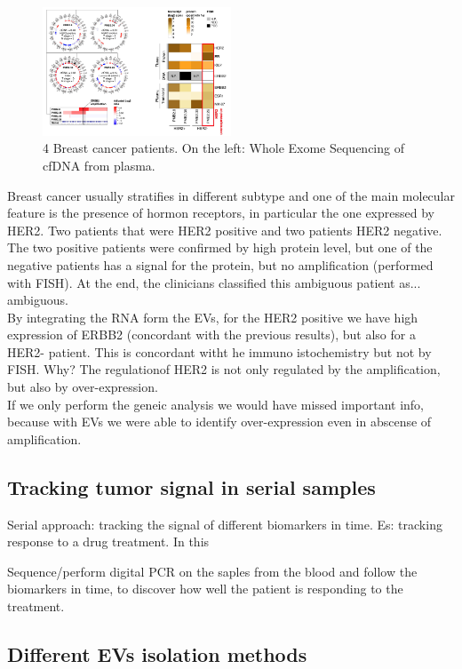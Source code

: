 \begin{figure}[H]
    \centering
    \includegraphics[width=0.5\textwidth]{cancer2.png}
    \caption{4 Breast cancer patients. On the left:  Whole Exome Sequencing of cfDNA from plasma. }
    \label{fig:cancer2}
\end{figure}

Breast cancer usually stratifies in different subtype and one of the main molecular feature is the presence of hormon receptors, in particular the one expressed by HER2.
Two patients that were HER2 positive and two patients HER2 negative. The two positive patients were confirmed by high protein level, but one of the negative patients has a signal for the protein, but no amplification (performed with FISH). At the end, the clinicians classified this ambiguous patient as... ambiguous.
\\
By integrating the RNA form the EVs, for the HER2 positive we have high expression of ERBB2 (concordant with the previous results), but also for a HER2- patient. This is concordant witht he immuno istochemistry but not by FISH. Why? The regulationof HER2 is not only regulated by the amplification, but also by over-expression.
\\
If we only perform the geneic analysis we would have missed important info, because with EVs we were able to identify over-expression even in abscense of amplification.

\subsection{Tracking tumor signal in serial samples}
Serial approach: tracking the signal of different biomarkers in time. Es: tracking response to a drug treatment. In this

Sequence/perform digital PCR on the saples from the blood and follow the biomarkers in time, to discover how well the patient is responding to the treatment.

\subsection{Different EVs isolation methods}
